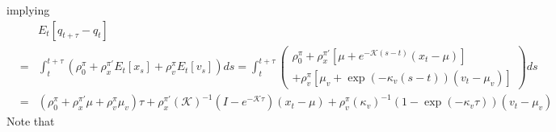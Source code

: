 \documentclass{article}
\begin{document}
implying%
\begin{eqnarray*}
&&E_{t}\left[ q_{t+\tau }-q_{t}\right] \\
&=&\int_{t}^{t+\tau }\left( \rho _{0}^{\pi }+\rho _{x}^{\pi \prime }E_{t} 
\left[ x_{s}\right] +\rho _{v}^{\pi }E_{t}\left[ v_{s}\right] \right)
ds=\int_{t}^{t+\tau }\left( 
\begin{array}{c}
\rho _{0}^{\pi }+\rho _{x}^{\pi \prime }\left[ \mu +e^{-\mathcal{K}\left(
s-t\right) }\left( x_{t}-\mu \right) \right] \\ 
+\rho _{v}^{\pi }\left[ \mu _{v}+\exp \left( -\kappa _{v}\left( s-t\right)
\right) \left( v_{t}-\mu _{v}\right) \right]%
\end{array}%
\right) ds \\
&=&\left( \rho _{0}^{\pi }+\rho _{x}^{\pi \prime }\mu +\rho _{v}^{\pi }\mu
_{v}\right) \tau +\rho _{x}^{\pi \prime }\left( \mathcal{K}\right)
^{-1}\left( I-e^{-\mathcal{K}\tau }\right) \left( x_{t}-\mu \right) +\rho
_{v}^{\pi }\left( \kappa _{v}\right) ^{-1}\left( 1-\exp \left( -\kappa
_{v}\tau \right) \right) \left( v_{t}-\mu _{v}\right)
\end{eqnarray*}%
Note that%
\end{document}

